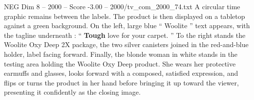 \begin{textsample}{NEG Dim 8 – 2000 – Score -3.00 – 2000/tv\_com\_2000\_74.txt}
A circular time graphic remains between the labels.
The product is then displayed on a tabletop against a green background.
On the left, large blue “ Woolite ” text appears, with the tagline underneath : “ \textbf{Tough} love for your carpet. ” To the right stands the Woolite Oxy Deep 2X package, the two silver canisters joined in the red-and-blue holder, label facing forward.
Finally, the blonde woman in white stands in the testing area holding the Woolite Oxy Deep product.
She wears her protective earmuffs and glasses, looks forward with a composed, satisfied expression, and flips or turns the product in her hand before bringing it up toward the viewer, presenting it confidently as the closing image.

\end{textsample}
